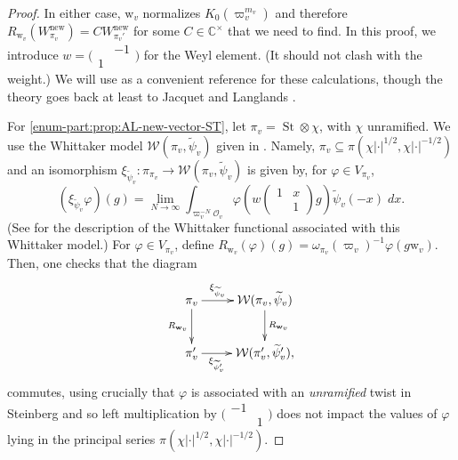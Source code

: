 \documentclass[10pt, twoside]{amsart}
\theoremstyle{plain}
\theoremstyle{definition}
\theoremstyle{remark}
\numberwithin{equation}{subsection}
\def\C{\mathbb C}
\def\new{\mathrm{new}}
\def\scro{\mathscr O}
\def\calw{\mathcal W}
\def\scro{\mathscr O}
\def\St{\operatorname{St}}
\newcommand{\smallmat}[4]{\bigl(\begin{smallmatrix}#1&#2\\#3&#4\end{smallmatrix}\bigr)}
\begin{document}
\begin{proof}
In either case, ${ \boldsymbol{\mathrm{w}}}_v$ normalizes $K_0(\varpi_v^{m_v})$ and therefore $R_{{ \boldsymbol{\mathrm{w}}}_v}(W_{\pi_v}^{\new}) = C W_{\pi_v'}^{\new}$ for some $C \in \C^\times$ that we need to find. In this proof, we introduce $w = \smallmat {}{-1}{1}{}$ for the Weyl element. (It should not clash with the weight.) We will use \cite{Schmidt} as a convenient reference for these calculations, though the theory goes back at least to Jacquet and Langlands \cite{JL}.

For \ref{enum-part:prop:AL-new-vector-ST}, let $\pi_v = \St \otimes \chi$, with $\chi$ unramified. We  use the Whittaker model $\calw(\pi_v,\widetilde \psi_v)$ given in \cite{Schmidt}. Namely, $\pi_v \subseteq \pi(\chi|\cdot|^{1/2},\chi|\cdot|^{-1/2})$ and an isomorphism $\xi_{\widetilde \psi_v} : \pi_{\pi_v} \rightarrow \calw(\pi_v,\widetilde \psi_v)$ is given by, for $\varphi \in V_{\pi_v}$,
\begin{equation*}
(\xi_{\widetilde \psi_v}\varphi)(g) = \lim_{N\rightarrow \infty} \int_{\varpi_v^{-N}\scro_v} \varphi\left(w\begin{pmatrix}1 & x \\ & 1 \end{pmatrix} g\right)\widetilde \psi_v(-x)\; dx.
\end{equation*}
(See \cite[Eq.\ (27)]{Schmidt} for the description of the Whittaker functional associated with this Whittaker model.) For $\varphi \in V_{\pi_v}$, define $R_{{ \boldsymbol{\mathrm{w}}}_v}(\varphi)(g) = \omega_{\pi_v}(\varpi_v)^{-1}\varphi(g{ \boldsymbol{\mathrm{w}}}_v)$. Then, one checks that the diagram
\begin{equation*}
\xymatrix{
{\pi_v} \ar[r]^-{\xi_{\widetilde \psi_v}} \ar[d]_-{R_{{ \boldsymbol{\mathrm{w}}}_v}}  & \calw(\pi_v,\widetilde \psi_v) \ar[d]^-{R_{{ \boldsymbol{\mathrm{w}}}_v}} \\
{\pi_v'} \ar[r]_-{\xi_{\widetilde \psi_v'}} & \calw(\pi_v',\widetilde \psi_v'),
}
\end{equation*}
commutes, using crucially that $\varphi$ is associated with an {\em unramified} twist in Steinberg and so left multiplication by $\smallmat{-1}{}{}{1}$ does not impact the values of $\varphi$ lying in the principal series $\pi(\chi|\cdot|^{1/2},\chi|\cdot|^{-1/2})$.


\end{proof}
\end{document}
